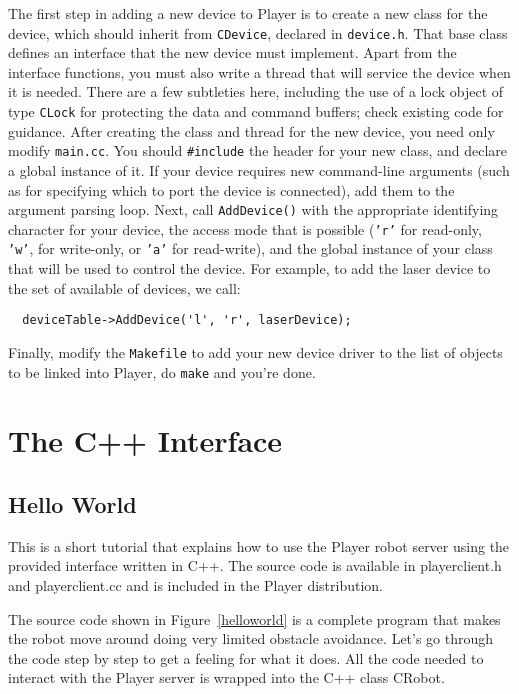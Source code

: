 \documentclass[11pt]{article}
\begin{document}
The first step in adding a new device to Player is to create a new class 
for the device, which should inherit from
{\tt CDevice}, declared in {\tt device.h}.  That base class defines 
an interface that the new device must implement.  Apart from the interface
functions, you must also write a thread that will service the
device when it is needed.    There are a few subtleties here, including
the use of a lock object of type {\tt CLock} for protecting the data and
command buffers; check existing code for guidance.
After creating the class and thread for the
new device, you need only modify {\tt main.cc}.  You should {\tt \#include} 
the header for your new class, and declare a global instance of it.
If your device requires new command-line arguments (such as for specifying
which to port the device is connected), add them to the argument parsing
loop.  Next, call {\tt AddDevice()} with the appropriate identifying
character for your device, the access mode that is possible ({\tt 'r'}
for read-only, {\tt 'w'}, for write-only, or {\tt 'a'} for read-write),
and the global instance of your class that will be used to control the
device.  For example, to add the laser device to the set of available of
devices, we call:
\begin{verbatim}
  deviceTable->AddDevice('l', 'r', laserDevice);
\end{verbatim}
Finally, modify the {\tt Makefile} to add your new device driver to
the list of objects to be linked into Player, do {\tt make} and you're
done.


\newpage
\appendix

\section{The C++ Interface}

\subsection{Hello World}

This is a short tutorial that explains how to use the Player robot
 server using the provided interface written in C++. The source
 code is available in playerclient.h and playerclient.cc and is 
included in the Player distribution.

The source code shown in Figure~\ref{helloworld} is a complete
program that makes the robot move around doing very limited obstacle 
avoidance.
Let's go through the code step by step to get a feeling for what
it does. All the code needed to interact with the Player server is
wrapped into the C++ class CRobot. 
\end{document}
